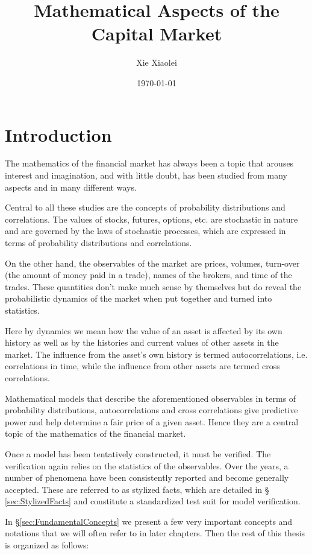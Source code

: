 \documentclass{book}
\title{Mathematical Aspects of the Capital Market}
\author{Xie Xiaolei}
\date{\today}
\begin{document}
\maketitle
\tableofcontents

\chapter{Introduction}
The mathematics of the financial market has always been a topic that
arouses interest and imagination, and with little doubt, has been
studied from many aspects and in many different ways.

Central to all these studies are the concepts of probability
distributions and correlations. The values of stocks, futures,
options, etc. are stochastic in nature and are governed by the laws of
stochastic processes, which are expressed in terms of probability
distributions and correlations.

On the other hand, the observables of the market are prices, volumes,
turn-over (the amount of money paid in a trade), names of the brokers,
and time of the trades. These quantities don't make much sense
by themselves but do reveal the probabilistic dynamics of the market
when put together and turned into statistics.

Here by dynamics we mean how the value of an asset is affected by its
own history as well as by the histories and current values of other
assets in the market. The influence from the asset's own history is
termed autocorrelations, i.e. correlations in time, while
the influence from other assets are termed cross correlations.

Mathematical models that describe the aforementioned observables in
terms of probability distributions, autocorrelations and cross
correlations give predictive power and help determine a fair price of
a given asset. Hence they are a central topic of the mathematics of
the financial market.

Once a model has been tentatively constructed, it must be
verified. The verification again relies on the statistics of the
observables. Over the years, a number of phenomena have been
consistently reported and become generally accepted. These are referred
to as stylized facts, which are detailed in \S
\ref{sec:StylizedFacts} and constitute a standardized test suit for
model verification.

In \S \ref{sec:FundamentalConcepts} we present a few very
important concepts and notations that we will often refer to in later
chapters. Then the rest of this thesis is organized as follows:
\end{document}

